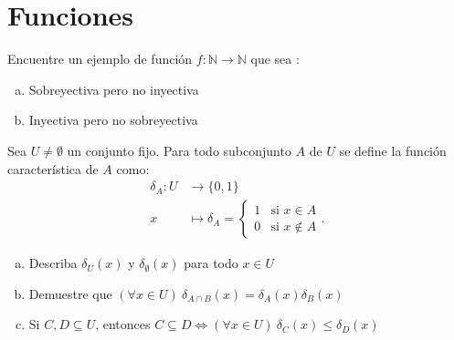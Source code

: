 \documentclass[dcc]{fcfmcourse}
\begin{document}
\section*{Funciones}
\begin{problems}
\problem Encuentre un ejemplo de funci\'on $f: \mathbb{N} \rightarrow \mathbb{N}$ que sea :
\begin{enumerate}[a)]
 \item Sobreyectiva pero no inyectiva
 \item Inyectiva pero no sobreyectiva
\end{enumerate} 
\problem Sea $U \not = \emptyset$ un conjunto fijo. Para todo subconjunto $A$ de $U$ se define  la función característica de $A$ como:
\begin{align*}
  \delta_{A} \colon U &\to \{0,1\}\\
  x &\mapsto \delta_{A} =  \left\{\begin{array}{lr}
        1 & \text{si } x\in A\\
        0 & \text{si } x\not\in A
        \end{array}
   \right..
\end{align*}
\begin{enumerate}[a)]
\item Describa $\delta_{U}(x)$ y $\delta_{\emptyset}(x)$ para todo $x \in U$
\item Demuestre que $(\forall x \in U)\ \delta_{A \cap B}(x) = \delta_{A}(x)\delta_{B}(x)$
\item Si $C,D \subseteq U$, entonces $C \subseteq D \Leftrightarrow (\forall x \in U)\ \delta_{C}(x) \le \delta_{D}(x)$
\end{enumerate}
\end{problems}
\end{document}
